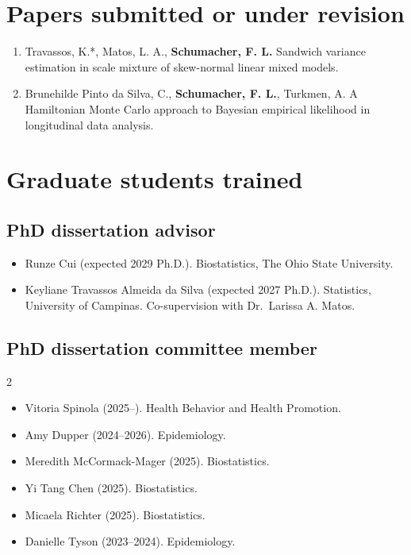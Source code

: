 \documentclass[
  10pt,
  letterpaper,
]{article}
\providecommand{\tightlist}{%
  \setlength{\itemsep}{0pt}\setlength{\parskip}{0pt}}
\begin{document}
\section{Papers submitted or under
revision}\label{papers-submitted-or-under-revision}

\begin{enumerate}
\def\labelenumi{\arabic{enumi}.}
\tightlist
\item
  Travassos, K.*, Matos, L. A., \textbf{Schumacher, F. L.} Sandwich
  variance estimation in scale mixture of skew-normal linear mixed
  models.
\item
  Brunehilde Pinto da Silva, C., \textbf{Schumacher, F. L.}, Turkmen, A.
  A Hamiltonian Monte Carlo approach to Bayesian empirical likelihood in
  longitudinal data analysis.
\end{enumerate}

\section{Graduate students trained}\label{graduate-students-trained}

\subsection{PhD dissertation advisor}\label{phd-dissertation-advisor}

\begin{itemize}
\tightlist
\item
  Runze Cui (expected 2029 Ph.D.). Biostatistics, The Ohio State
  University.
\item
  Keyliane Travassos Almeida da Silva (expected 2027 Ph.D.). Statistics,
  University of Campinas. Co-supervision with Dr.~Larissa A. Matos.
\end{itemize}

\subsection{PhD dissertation committee
member}\label{phd-dissertation-committee-member}

\begin{multicols}{2}\raggedright

\begin{itemize}
\tightlist
\item
  Vitoria Spinola (2025--). Health Behavior and Health Promotion.
\item
  Amy Dupper (2024--2026). Epidemiology.
\item
  Meredith McCormack-Mager (2025). Biostatistics.
\item
  Yi Tang Chen (2025). Biostatistics.
\item
  Micaela Richter (2025). Biostatistics.
\item
  Danielle Tyson (2023--2024). Epidemiology.
\end{itemize}

\end{multicols}
\end{document}
